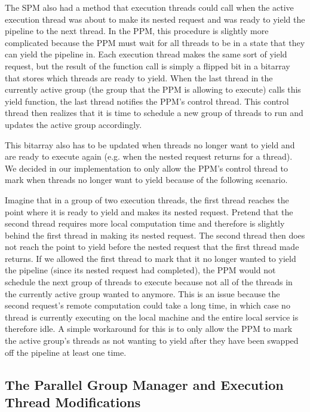\documentclass[11pt, oneside]{report}
\begin{document}
The SPM also had a method that execution threads could call when the active execution thread was about to make its nested request and was ready to yield the pipeline to the next thread. 
In the PPM, this procedure is slightly more complicated because the PPM must wait for all threads to be in a state that they can yield the pipeline in. 
Each execution thread makes the same sort of yield request, but the result of the function call is simply a flipped bit in a bitarray that stores which threads are ready to yield. 
When the last thread in the currently active group (the group that the PPM is allowing to execute) calls this yield function, the last thread notifies the PPM's control thread.
This control thread then realizes that it is time to schedule a new group of threads to run and updates the active group accordingly. 

This bitarray also has to be updated when threads no longer want to yield and are ready to execute again (e.g. when the nested request returns for a thread). 
We decided in our implementation to only allow the PPM's control thread to mark when threads no longer want to yield because of the following scenario. 

Imagine that in a group of two execution threads, the first thread reaches the point where it is ready to yield and makes its nested request. 
Pretend that the second thread requires more local computation time and therefore is slightly behind the first thread in making its nested request.
The second thread then does not reach the point to yield before the nested request that the first thread made returns.
If we allowed the first thread to mark that it no longer wanted to yield the pipeline (since its nested request had completed), the PPM would not schedule the next group of threads to execute because not all of the threads in the currently active group wanted to anymore.
This is an issue because the second request's remote computation could take a long time, in which case no thread is currently executing on the local machine and the entire local service is therefore idle.
A simple workaround for this is to only allow the PPM to mark the active group's threads as not wanting to yield after they have been swapped off the pipeline at least one time.

\subsection{The Parallel Group Manager and Execution Thread Modifications}
\end{document}
